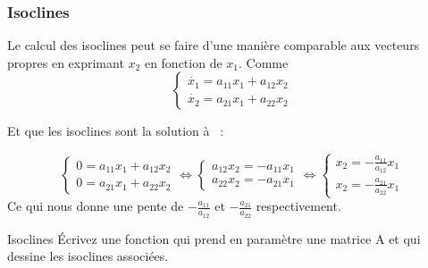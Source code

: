             \subsubsection{Isoclines}
                Le calcul des isoclines peut se faire d'une manière comparable aux vecteurs propres en exprimant $x_2$ en fonction de $x_1$.
                Comme
                \begin{equation*}
                    \begin{cases}
                        \dot{x_1} = a_{11}x_1 + a_{12} x_2\\
                        \dot{x_2} = a_{21}x_1 + a_{22} x_2
                    \end{cases}
                \end{equation*}
                
                Et que les isoclines sont la solution à ~:
                
                \begin{equation*}
                    \begin{cases}
                        0 = a_{11}x_1 + a_{12} x_2\\
                        0 = a_{21}x_1 + a_{22} x_2
                    \end{cases}
                    \Longleftrightarrow
                    \begin{cases}
                        a_{12} x_2 = -a_{11}x_1\\
                        a_{22} x_2 = -a_{21}x_1
                    \end{cases}
                    \Longleftrightarrow
                    \begin{cases}
                        x_2 = -\frac{a_{11}}{a_{12}}x_1\\
                        x_2 = -\frac{a_{21}}{a_{22}}x_1
                    \end{cases}
                \end{equation*}
                Ce qui nous donne une pente de $-\frac{a_{11}}{a_{12}}$ et $-\frac{a_{21}}{a_{22}}$ respectivement.

                \begin{exercise}{Isoclines}
                    Écrivez une fonction  qui prend en paramètre une matrice A et qui dessine les isoclines associées.
                \end{exercise}
                
